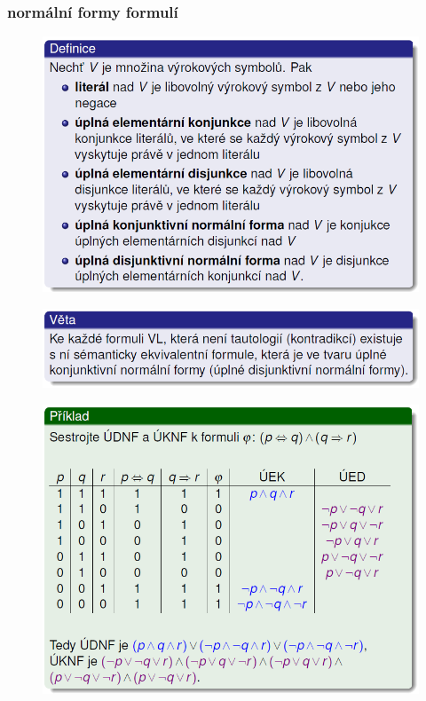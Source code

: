\documentclass[10pt,a4paper]{article}
\theoremstyle{note}
\begin{document}
		\subsubsection{normální formy formulí}

			\begin{figure}[!h]
			\centering
			\includegraphics[width=13cm]{img/UKNF.png}
			\end{figure}

			\begin{figure}[!h]
			\centering
			\includegraphics[width=13cm]{img/vetaUKNF.png}
			\end{figure}

			\begin{figure}[!h]
			\centering
			\includegraphics[width=13cm]{img/prikladUKNF.png}
			\end{figure}
\end{document}

